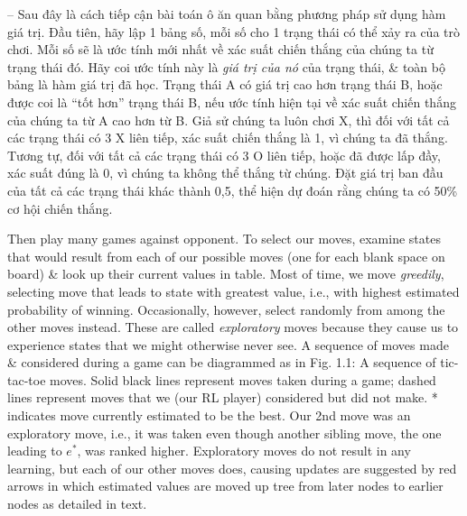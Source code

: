 \documentclass{article}
\begin{document}
\begin{itemize}
\begin{itemize}
        -- Sau đây là cách tiếp cận bài toán ô ăn quan bằng phương pháp sử dụng hàm giá trị. Đầu tiên, hãy lập 1 bảng số, mỗi số cho 1 trạng thái có thể xảy ra của trò chơi. Mỗi số sẽ là ước tính mới nhất về xác suất chiến thắng của chúng ta từ trạng thái đó. Hãy coi ước tính này là {\it giá trị của nó} của trạng thái, \& toàn bộ bảng là hàm giá trị đã học. Trạng thái A có giá trị cao hơn trạng thái B, hoặc được coi là ``tốt hơn'' trạng thái B, nếu ước tính hiện tại về xác suất chiến thắng của chúng ta từ A cao hơn từ B. Giả sử chúng ta luôn chơi X, thì đối với tất cả các trạng thái có 3 X liên tiếp, xác suất chiến thắng là 1, vì chúng ta đã thắng. Tương tự, đối với tất cả các trạng thái có 3 O liên tiếp, hoặc đã được lấp đầy, xác suất đúng là 0, vì chúng ta không thể thắng từ chúng. Đặt giá trị ban đầu của tất cả các trạng thái khác thành 0,5, thể hiện dự đoán rằng chúng ta có 50\% cơ hội chiến thắng.

        Then play many games against opponent. To select our moves, examine states that would result from each of our possible moves (one for each blank space on board) \& look up their current values in table. Most of time, we move {\it greedily}, selecting move that leads to state with greatest value, i.e., with highest estimated probability of winning. Occasionally, however, select randomly from among the other moves instead. These are called {\it exploratory} moves because they cause us to experience states that we might otherwise never see. A sequence of moves made \& considered during a game can be diagrammed as in {\sf Fig. 1.1: A sequence of tic-tac-toe moves. Solid black lines represent moves taken during a game; dashed lines represent moves that we (our RL player) considered but did not make. * indicates move currently estimated to be the best. Our 2nd move was an exploratory move, i.e., it was taken even though another sibling move, the one leading to $e^*$, was ranked higher. Exploratory moves do not result in any learning, but each of our other moves does, causing updates are suggested by red arrows in which estimated values are moved up tree from later nodes to earlier nodes as detailed in text.}


\end{itemize}
\end{itemize}
\end{document}
